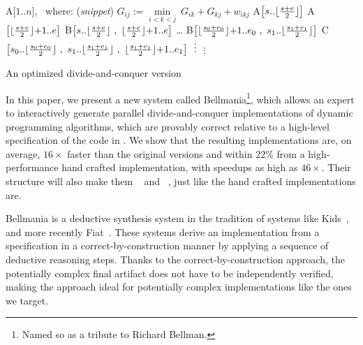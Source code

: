 \begin{algorithm}[b!]
\fontsize{9}{10}   %
\begin{algorithmic}
  \State A[$1..n$], ~where: \hfill{\normalsize (\textit{snippet})}
	      \State $G_{ij} := \underset{i<k<j}\min ~ G_{ik} + G_{kj} + w_{ikj}$
	    \EndFor
	  \EndFor
    \vspace{-5pt}
	\Else
	  \State A$\big[ s..\lfloor\frac{s+e}{2}\rfloor \big]$
	  \State A$\big[ \lfloor\frac{s+e}{2}\rfloor{+}1..e \big]$
	  \State B$\big[ s..\lfloor\frac{s+e}{2}\rfloor ~,~ \lfloor\frac{s+e}{2}\rfloor{+}1..e \big]$
	\EndIf
  \EndProcedure
	 \ldots
	\Else
	  \State B$\big[ \lfloor\frac{s_0+e_0}{2}\rfloor{+}1..e_0 ~,~ s_1..\lfloor\frac{s_1+e_1}{2}\rfloor \big]$
	  \State C$\big[ s_0..\lfloor\frac{s_0+e_0}{2}\rfloor ~,~ s_1..\lfloor\frac{s_1+e_1}{2}\rfloor ~,~ \lfloor\frac{s_1+e_1}{2}\rfloor{+}1..e_1 \big]$
	  \vspace{-5pt}
	  \State $\vdotswithin{C}$
	\EndIf
  \EndProcedure
    \vspace{-5pt}
    \State $\vdots$
  \EndProcedure
\end{algorithmic}
\caption{\label{intro:divide-and-conquer}
   An optimized divide-and-conquer version}
\end{algorithm}




In this paper, we present a new system called Bellmania\footnote{Named so as a tribute to Richard Bellman.}, which allows an expert to interactively generate parallel divide-and-conquer implementations of dynamic programming algorithms, which are provably correct relative to a high-level specification of the code in . We show that the resulting implementations are, on average, $16\times$ faster than the original versions and within $22\%$ from a high-performance hand crafted implementation, with speedups as high as $46\times$.
Their structure will also make them ~\cite{FOCS99/Frigo} and ~\cite{SODA14/Bender}, just like the hand crafted implementations are.


Bellmania is a deductive synthesis system in the tradition of systems like Kids~\cite{TSE90/Smith}, and more recently Fiat~\cite{POPL15/Delaware}. 
These systems derive an implementation from a specification in a correct-by-construction manner by applying a sequence of deductive reasoning steps. Thanks to the correct-by-construction approach, the potentially complex final artifact does not have to be independently verified, making the approach ideal for potentially complex implementations like the ones we target. 

